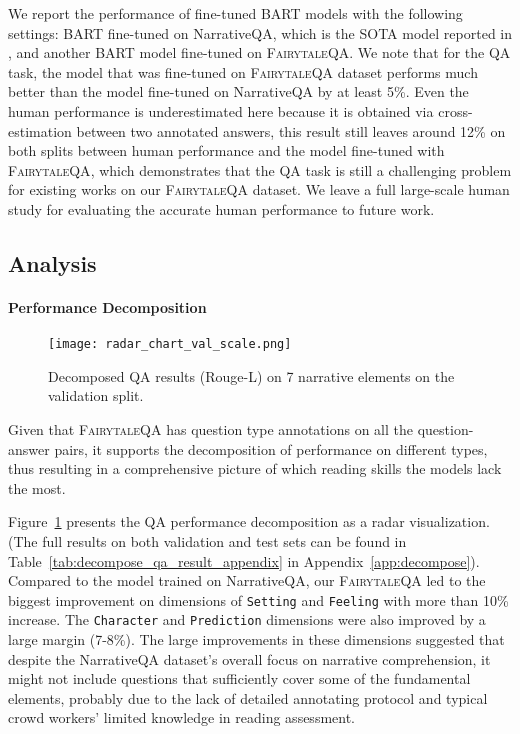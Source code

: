 \documentclass[11pt]{article}
\newcommand{\datasetname}{\textsc{FairytaleQA}\xspace}
\begin{document}
We report the performance of fine-tuned BART models with the following settings: BART fine-tuned on NarrativeQA, which is the SOTA model reported in \cite{mou2021narrative}, and another BART model fine-tuned on \datasetname. We note that for the QA task, the model that was fine-tuned on \datasetname dataset performs much better than the model fine-tuned on NarrativeQA by at least 5\%. Even the human performance is underestimated here because it is obtained via cross-estimation between two annotated answers, this result still leaves around 12\% on both splits between human performance and the model fine-tuned with \datasetname, which demonstrates that the QA task is still a challenging problem for existing works on our \datasetname dataset. We leave a full large-scale human study for evaluating the accurate human performance to future work. 



\subsection{Analysis}

\paragraph{Performance Decomposition}

\begin{figure}[t]
\texttt{[image: radar\_chart\_val\_scale.png]}

\caption{\small{Decomposed QA results (Rouge-L) on 7 narrative elements on the validation split.}}
\label{fig:decompose_qa_result_val}
\end{figure}


















Given that \datasetname has question type annotations on all the question-answer pairs, it supports the decomposition of performance on different types, thus resulting in a comprehensive picture of which reading skills the models lack the most.



Figure~\ref{fig:decompose_qa_result_val} presents the QA performance decomposition as a radar visualization. (The full results on both validation and test sets can be found in Table~\ref{tab:decompose_qa_result_appendix} in Appendix~\ref{app:decompose}). Compared to the model trained on NarrativeQA, our \datasetname led to the biggest improvement on dimensions of \texttt{Setting} and \texttt{Feeling} with more than 10\% increase.
The \texttt{Character} and \texttt{Prediction} dimensions were also improved by a large margin (7-8\%).
The large improvements in these dimensions suggested that despite the NarrativeQA dataset's overall focus on narrative comprehension, it might not include questions that sufficiently cover some of the fundamental elements, probably due to the lack of detailed annotating protocol and typical crowd workers' limited knowledge in reading assessment.
\end{document}

